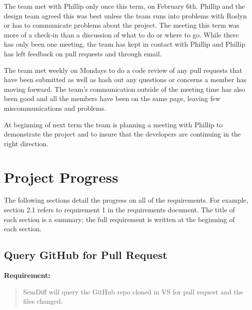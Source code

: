 \documentclass[draftclsnofoot,onecolumn]{IEEEtran}
\begin{document}
The team met with Phillip only once this term, on February 6th. Phillip and the 
design team agreed this was best unless the team runs into problems with Roslyn 
or has to communicate problems about the project. The meeting this term was 
more of a check-in than a discussion of what to do or where to go. While there 
has only been one meeting, the team has kept in contact with Phillip and 
Phillip has left feedback on pull requests and through email.

The team met weekly on Mondays to do a code review of any pull requests that 
have been submitted as well as hash out any questions or concerns a member has 
moving forward. The team’s communication outside of the meeting time has also 
been good and all the members have been on the same page, leaving few 
miscommunications and problems.

At beginning of next term the team is planning a meeting with Phillip to 
demonstrate the project and to insure that the developers are continuing in the 
right direction.

\section{Project Progress}%

The following sections detail the progress on all of the requirements. For 
example, section 2.1 refers to requirement 1 in the requirements document. The 
title of each section is a summary; the full requirement is written at the 
beginning of each section.

\subsection{Query GitHub for Pull Request}%

\textbf{Requirement:}

\begin{quote}

SemDiff will query the GitHub repo cloned in VS for pull request and the files 
changed.

\end{quote}
\end{document}
